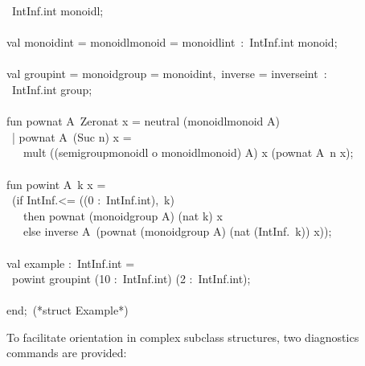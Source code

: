 \begin{isabellebody}
\begin{isamarkuptext}
\hspace*{0pt} ~IntInf.int monoidl;\\
\hspace*{0pt}\\
\hspace*{0pt}val monoid{}int = {}monoidl{}monoid = monoidl{}int{}~:~IntInf.int monoid;\\
\hspace*{0pt}\\
\hspace*{0pt}val group{}int = {}monoid{}group = monoid{}int,~inverse = inverse{}int{}~:\\
\hspace*{0pt} ~IntInf.int group;\\
\hspace*{0pt}\\
\hspace*{0pt}fun pow{}nat A{}~Zero{}nat x = neutral (monoidl{}monoid A{})\\
\hspace*{0pt} ~| pow{}nat A{}~(Suc n) x =\\
\hspace*{0pt} ~~~mult ((semigroup{}monoidl o monoidl{}monoid) A{}) x (pow{}nat A{}~n x);\\
\hspace*{0pt}\\
\hspace*{0pt}fun pow{}int A{}~k x =\\
\hspace*{0pt} ~(if IntInf.<= ((0 :~IntInf.int),~k)\\
\hspace*{0pt} ~~~then pow{}nat (monoid{}group A{}) (nat k) x\\
\hspace*{0pt} ~~~else inverse A{}~(pow{}nat (monoid{}group A{}) (nat (IntInf.{}~k)) x));\\
\hspace*{0pt}\\
\hspace*{0pt}val example :~IntInf.int =\\
\hspace*{0pt} ~pow{}int group{}int (10 :~IntInf.int) ({}2 :~IntInf.int);\\
\hspace*{0pt}\\
\hspace*{0pt}end;~(*struct Example*)%
\end{isamarkuptext}%
\isamarkuptrue%
%
\endisatagquote
{\isafoldquote}%
%
\isadelimquote
%
\endisadelimquote
%
\isamarkuptrue%
%
\begin{isamarkuptext}%
To facilitate orientation in complex subclass structures,
  two diagnostics commands are provided:


\end{isamarkuptext}
\end{isabellebody}
